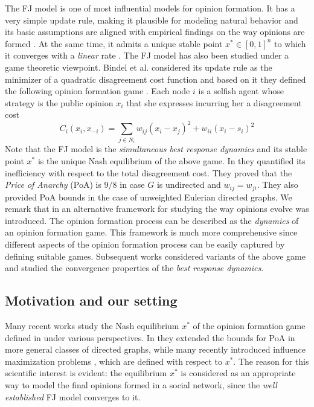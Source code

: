 The FJ model is one of most influential models for opinion formation. It has a
very simple update rule, making it plausible for modeling natural behavior and
its basic assumptions are aligned with empirical findings on the way opinions
are formed \cite{AFH05,K47}.  At the same time, it admits a unique stable
point $x^* \in [0,1]^n$ to which it converges with a \emph{linear} rate
\cite{GS14}.  The FJ model has also been studied under a game theoretic
viewpoint.  Bindel et al. considered its update rule as the minimizer of a
quadratic disagreement cost function and based on it they defined the following
opinion formation game \cite{BKO11}. Each node $i$ is a selfish agent whose
strategy is the public opinion $x_i$ that she expresses incurring her a
disagreement cost
%
\begin{equation}\label{eq:BKO_cost}
  C_i(x_i,x_{-i})= \sum_{j \in N_i}w_{ij} (x_i-x_j)^2 + w_{ii}(x_i-s_i)^2
\end{equation}
%
Note that the FJ model is the \emph{simultaneous best response dynamics} and
its stable point $x^*$ is the unique Nash equilibrium of the above game.  In
\cite{BKO11} they quantified its inefficiency with respect to the total
disagreement cost. They proved that the \emph{Price of Anarchy} (PoA) is $9/8$
in case $G$ is undirected and $w_{ij}=w_{ji}$. They also provided PoA bounds in
the case of unweighted Eulerian directed graphs.  We remark that in
\cite{BKO11} an alternative framework for studying the way opinions evolve
was introduced.  The opinion formation process can be described as the
\emph{dynamics} of an opinion formation game.  This framework is much more
comprehensive since different aspects of the opinion formation process can be
easily captured by defining suitable games.
Subsequent works \cite{BGM13,BFM16,EFHS17} considered variants of
the above game and studied the convergence properties of the \emph{best
 response dynamics}.

\subsection{Motivation and our setting}

Many recent works study the Nash equilibrium $x^*$ of the opinion formation
game defined in \cite{BKO11} under various perspectives. In \cite{CCL16} they
extended the bounds for PoA in more general classes of directed graphs, while
many recently introduced influence maximization problems
\cite{GTT13,AKPT18,MMT17}, which are defined with respect to $x^*$.
The reason for this scientific interest is evident: the equilibrium $x^*$ is
considered as an appropriate way to model the final opinions formed in a social
network, since the \emph{well established} FJ model converges to it.

